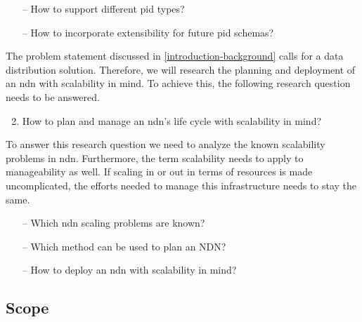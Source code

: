 
\begin{itemize}
    \item[--] How to support different \gls{pid} types?
    \item[--] How to incorporate extensibility for future \gls{pid} schemas?
\end{itemize}

The problem statement discussed in \ref{introduction-background} calls for a data distribution solution. Therefore, we will research the planning and deployment of an \gls{ndn} with scalability in mind. To achieve this, the following research question needs to be answered.
\begin{enumerate}
\setcounter{enumi}{1}
    \item How to plan and manage an \gls{ndn}'s life cycle with scalability in mind?
\end{enumerate}

To answer this research question we need to analyze the known scalability problems in \gls{ndn}. Furthermore, the term scalability needs to apply to manageability as well. If scaling in or out in terms of resources is made uncomplicated, the efforts needed to manage this infrastructure needs to stay the same.
\begin{itemize}
    \item[--] Which \gls{ndn} scaling problems are known?
    \item[--] Which method can be used to plan an NDN?
    \item[--] How to deploy an \gls{ndn} with scalability in mind?
\end{itemize}

\subsection{Scope}
\label{introduction-scope}

